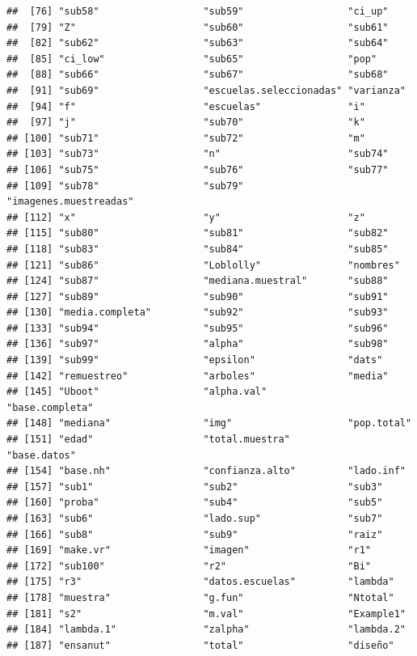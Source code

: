\documentclass[
]{book}
\begin{document}
\begin{verbatim}
##  [76] "sub58"                  "sub59"                  "ci_up"                 
##  [79] "Z"                      "sub60"                  "sub61"                 
##  [82] "sub62"                  "sub63"                  "sub64"                 
##  [85] "ci_low"                 "sub65"                  "pop"                   
##  [88] "sub66"                  "sub67"                  "sub68"                 
##  [91] "sub69"                  "escuelas.seleccionadas" "varianza"              
##  [94] "f"                      "escuelas"               "i"                     
##  [97] "j"                      "sub70"                  "k"                     
## [100] "sub71"                  "sub72"                  "m"                     
## [103] "sub73"                  "n"                      "sub74"                 
## [106] "sub75"                  "sub76"                  "sub77"                 
## [109] "sub78"                  "sub79"                  "imagenes.muestreadas"  
## [112] "x"                      "y"                      "z"                     
## [115] "sub80"                  "sub81"                  "sub82"                 
## [118] "sub83"                  "sub84"                  "sub85"                 
## [121] "sub86"                  "Loblolly"               "nombres"               
## [124] "sub87"                  "mediana.muestral"       "sub88"                 
## [127] "sub89"                  "sub90"                  "sub91"                 
## [130] "media.completa"         "sub92"                  "sub93"                 
## [133] "sub94"                  "sub95"                  "sub96"                 
## [136] "sub97"                  "alpha"                  "sub98"                 
## [139] "sub99"                  "epsilon"                "dats"                  
## [142] "remuestreo"             "arboles"                "media"                 
## [145] "Uboot"                  "alpha.val"              "base.completa"         
## [148] "mediana"                "img"                    "pop.total"             
## [151] "edad"                   "total.muestra"          "base.datos"            
## [154] "base.nh"                "confianza.alto"         "lado.inf"              
## [157] "sub1"                   "sub2"                   "sub3"                  
## [160] "proba"                  "sub4"                   "sub5"                  
## [163] "sub6"                   "lado.sup"               "sub7"                  
## [166] "sub8"                   "sub9"                   "raiz"                  
## [169] "make.vr"                "imagen"                 "r1"                    
## [172] "sub100"                 "r2"                     "Bi"                    
## [175] "r3"                     "datos.escuelas"         "lambda"                
## [178] "muestra"                "g.fun"                  "Ntotal"                
## [181] "s2"                     "m.val"                  "Example1"              
## [184] "lambda.1"               "zalpha"                 "lambda.2"              
## [187] "ensanut"                "total"                  "diseño"
\end{verbatim}
\end{document}
